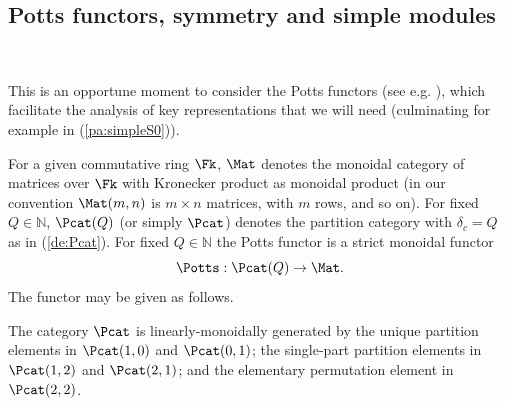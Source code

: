 \documentclass[reqno,10pt,a4paper]{amsart}
\newcommand{\N}{\mathbb{N}}
\newcommand{\red}[1]{\textcolor{red}{#1}}
\newcommand{\ppm}[1]{\red{#1}}
\begin{document}

%  








\subsection{Potts functors, symmetry and simple modules} 
$\;$   \label{ss:PottsFunctors}


%

\noindent 
This is an opportune moment to consider the Potts functors (see e.g. \cite{Martin91,Martin08a}), 
which facilitate the analysis of key representations that we will need
(culminating for example in (\ref{pa:simpleS0})). 

\mdef   \label{de:PottsFunctor}
%
For a given commutative ring $\Fk$, 
$\Mat$ denotes the monoidal category of matrices over $\Fk$ with Kronecker product as monoidal product
(in our convention 
$\Mat(m,n)$ is $m\times n$ matrices, with $m$ rows, and so on). 
%
For fixed $Q \in \N$,
$\Pcat(Q)$ 
(or 
simply 
$\Pcat$) 
denotes the partition category with $\delta_c = Q$
as in (\ref{de:Pcat}).
%
For fixed $Q \in \N$ 
the Potts functor is a strict monoidal functor 
$$
\Potts : \Pcat(Q) \rightarrow \Mat   .
$$
The functor may be given as follows.



%

\mdef  \label{de:Potts}
The category $\Pcat$ 
is linearly-monoidally generated by the unique partition elements in 
$\Pcat(1,0)$ and $\Pcat(0,1)$; the single-part partition elements in $\Pcat(1,2)$ and $\Pcat(2,1)$;
and the elementary permutation element in 
$\Pcat(2,2)$. 
\end{document}
